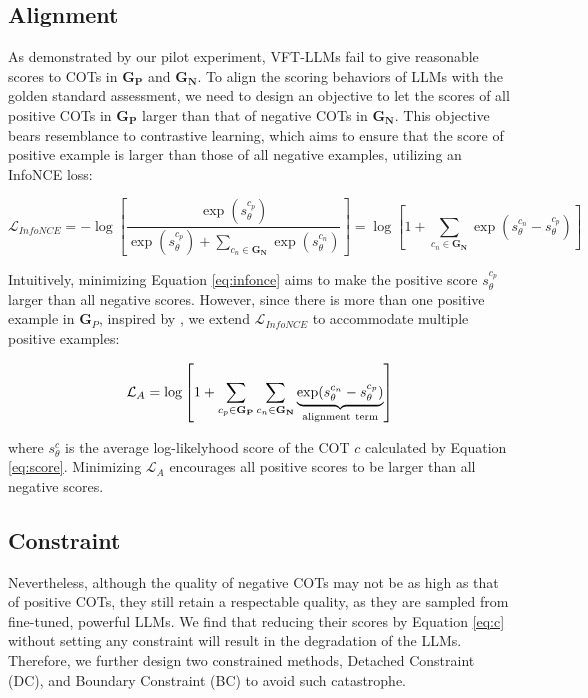\subsection{Alignment}
As demonstrated by our pilot experiment, VFT-LLMs fail to give reasonable scores to COTs in $\mathbf{G_P}$ and $\mathbf{G_N}$.
To align the scoring behaviors of LLMs with the golden standard assessment, we need to design an objective to let the scores of all positive COTs in $\mathbf{G_P}$ larger than that of negative COTs in $\mathbf{G_N}$.
This objective bears resemblance to contrastive learning, which aims to ensure that the score of positive example is larger than those of all negative examples, utilizing an InfoNCE loss:

\begin{equation}
    \mathcal{L}_{InfoNCE} = -\log\left[\frac{\exp(s_{\theta}^{c_p})}{\exp(s_{\theta}^{c_p}) + \sum_{c_n \in \mathbf{G_N}} \exp(s_{\theta}^{c_n})}\right] = \log\left[1 + \sum_{c_n \in \mathbf{G_N}} \exp(s_{\theta}^{c_n} - s_{\theta}^{c_p})\right]
    \label{eq:infonce}
\end{equation}

Intuitively, minimizing Equation \ref{eq:infonce}  aims to make the positive score $s_{\theta}^{c_p}$ larger than all negative scores. However, since there is more than one positive example in $\mathbf{G}_P$, inspired by \citep{su2022zlpr,wang-etal-2022-hpt}, we extend $\mathcal{L}_{InfoNCE}$ to accommodate multiple positive examples:

\begin{equation}
    \mathcal{L}_A= \log\left[1 + \sum_{c_p \in \mathbf{G_P}}\sum_{c_n \in \mathbf{G_N}}  \underbrace{\exp(s_{\theta}^{c_n} - s_{\theta}^{c_p})}_{\rm  alignment \ term} \right]
    \label{eq:c}
\end{equation}

where $s_{\theta}^c$ is the average log-likelyhood score of the COT $c$ calculated by Equation \ref{eq:score}.
Minimizing $\mathcal{L}_A$ encourages all positive scores to be larger than all negative scores.

\subsection{Constraint} 
Nevertheless, although the quality of negative COTs may not be as high as that of positive COTs, they still retain a respectable quality, as they are sampled from fine-tuned, powerful LLMs. We find that reducing their scores by Equation \ref{eq:c} without setting any constraint will result in the degradation of the LLMs. Therefore, we further design two constrained methods, Detached Constraint (DC), and Boundary Constraint (BC) to avoid such catastrophe.

